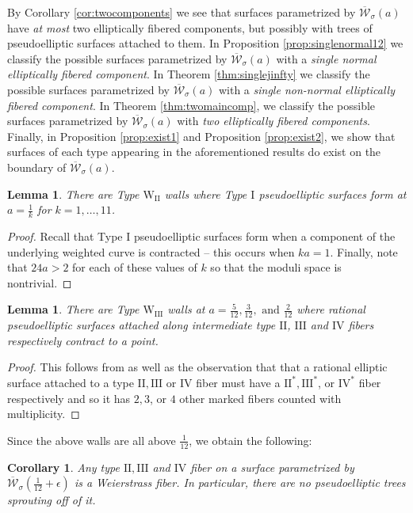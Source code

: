 \documentclass[11pt]{amsart}
\newtheorem{lemma}[theorem]{Lemma}
\newtheorem{cor}[theorem]{Corollary}
\theoremstyle{definition}
\theoremstyle{remark}
\newcommand{\calW}{\mathcal W}
\newcommand{\wii}{\mathrm{W}_{\mathrm{II}}}
\newcommand{\wiii}{\mathrm{W}_{\mathrm{III}}}
\newcommand{\ska}{\overline{\calW}_\sigma(a)}
\newcommand{\ktwelve}{\overline{\calW}_\sigma({\frac{1}{12}+\epsilon})}
\begin{document}
	By Corollary \ref{cor:twocomponents} we see that surfaces parametrized by $\ska$ have \emph{at most} two elliptically fibered components, but possibly with trees of pseudoelliptic surfaces attached to them. In Proposition \ref{prop:singlenormal12} we classify the possible surfaces parametrized by $\ska$ with a \emph{single normal elliptically fibered component}. In Theorem \ref{thm:singlejinfty} we classify the possible surfaces parametrized by $\ska$ with a \emph{single non-normal elliptically fibered component}. In Theorem \ref{thm:twomaincomp}, we classify the possible surfaces 
	parametrized by $\ska$ with \emph{two elliptically fibered components}. Finally, in Proposition \ref{prop:exist1} and Proposition \ref{prop:exist2}, we show that surfaces of each type appearing in the aforementioned results do exist on the boundary of $\ska$.
	
	\begin{lemma}There are Type $\wii$ walls where Type $\mathrm{I}$ pseudoelliptic surfaces form at $a = \frac{1}{k}$ for $k = 1, \dots, 11$. \end{lemma}
	\begin{proof} Recall that Type I pseudoelliptic surfaces form when a component of the underlying weighted curve is contracted -- this occurs when $ka=1$. Finally, note that $24a>2$ for each of these values of $k$ so that the moduli space is nontrivial. \end{proof}
	
	\begin{lemma} There are Type $\wiii$ walls at
		$
		a = \frac{5}{12}, \frac{3}{12}, \text{ and } \frac{2}{12}
		$
		where rational pseudoelliptic surfaces attached along intermediate type $\mathrm{II}$, $\mathrm{III}$ and $\mathrm{IV}$ fibers respectively contract to a point. \end{lemma} 
	
	\begin{proof} This follows from \cite[Theorem 6.3]{master} as well as the observation that that a rational elliptic surface attached to a type $\mathrm{II}, \mathrm{III}$ or $\mathrm{IV}$ fiber must have a $\mathrm{II}^*, \mathrm{III}^*$, or $\mathrm{IV}^*$ fiber respectively and so it has $2,3$, or $4$ other marked fibers counted with multiplicity. \end{proof} 
	
	Since the above walls are all above $\frac{1}{12}$, we obtain the following: 
	
	\begin{cor}\label{cor:234:weierstrass} Any type $\mathrm{II}, \mathrm{III}$ and $\mathrm{IV}$ fiber on a surface parametrized by $\ktwelve$ is a Weierstrass fiber. In particular, there are no pseudoelliptic trees sprouting off of it. 
	\end{cor}
	
\end{document}
